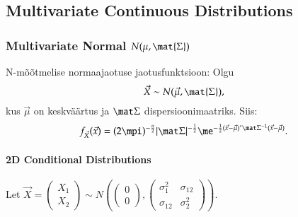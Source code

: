 \documentclass[a4paper]{article}
\numberwithin{equation}{subsection}
\begin{document}
\clearpage
\subsection{Multivariate Continuous Distributions}

\subsubsection{Multivariate Normal $N(\mu, \mat{\Sigma})$}

N-mõõtmelise normaajaotuse jaotusfunktsioon: Olgu
\begin{equation}
  \vec{X} \sim N(\vec{\mu}, \mat{\Sigma}),
\end{equation}
kus $\vec\mu$ on keskväärtus ja $\mat\Sigma$ dispersioonimaatriks.
Siis:
\begin{equation}
f_{\vec{X}} (\vec x) = 
  (2\mpi)^{-\frac{n}{2}} 
  |\mat\Sigma|^{-\frac{1}{2}}
  \me^{-\frac{1}{2}(\vec x - \vec\mu)' \mat\Sigma^{-1} (\vec x -
    \vec\mu)}.
\label{eq:N-Dimensional_normal}
\end{equation}

\paragraph{2D Conditional Distributions}
Let
\begin{math}
  \vec{X}=
  \begin{pmatrix}
    X_1\\
    X_2
  \end{pmatrix}
  \sim
  N \left( 
    \begin{pmatrix}
      0\\0
    \end{pmatrix},
    \begin{pmatrix}
      \sigma_1^2 & \sigma_{12} \\ 
      \sigma_{12} & \sigma_2^2
    \end{pmatrix}
\right)
\end{math}.
\end{document}
